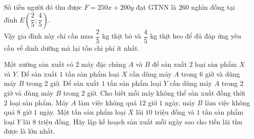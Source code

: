 \begin{bt}
{{\begin{tikzpicture}[scale=1.3, font=\footnotesize, line join=round, line cap=round, >=stealth]
\end{tikzpicture}}
		\noindent Số tiền người đó thu được $F=250x+200y$ đạt GTNN là $260$ nghìn đồng tại đỉnh $E\left(\dfrac{2}{5};\dfrac{4}{5}\right)$.\\
		Vậy gia đình này chỉ cần mua $\dfrac{2}{5}$ kg thịt bò và $\dfrac{4}{5}$ kg thịt heo để đủ đáp ứng yêu cầu về dinh dưỡng mà lại tốn chi phí ít nhất.
	}
\end{bt}

\begin{bt}%
	Một xưởng sản xuất có $ 2 $ máy đặc chủng $A$ và $B$ để sản xuất $ 2 $ loại sản phẩm $X$ và $Y$. Để sản xuất $ 1 $ tấn sản phẩm loại $X$ cần dùng máy $A $ trong $ 6 $ giờ và dùng máy $ B$ trong $ 2 $ giờ. Để sản xuất $ 1 $ tấn sản phẩm loại $Y  $ cần dùng máy $ A $ trong $ 2 $ giờ và dùng máy $B$ trong $ 2 $ giờ. Cho biết mỗi máy không thể sản xuất đồng thời $ 2 $ loại sản phẩm. Máy $A$ làm việc không quá $ 12 $ giờ $ 1 $ ngày, máy $B$ làm việc không quá $ 8 $ giờ $ 1 $ ngày. Một tấn sản phẩm loại $X$ lãi $ 10 $ triệu đồng và $ 1 $ tấn sản phẩm loại $Y$ lãi $ 8 $ triệu đồng. Hãy lập kế hoạch sản xuất mỗi ngày sao cho tiền lãi thu được là lớn nhất.
\end{bt}
